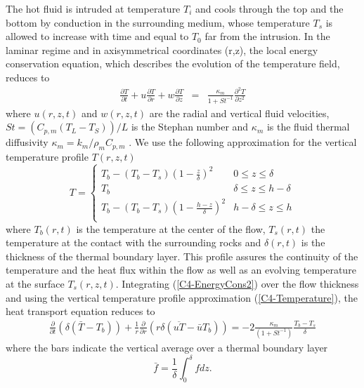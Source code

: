 The hot fluid  is intruded at temperature $T_i$ and  cools through the
top  and the  bottom by  conduction in  the surrounding  medium, whose
temperature $T_s$ is allowed to increase  with time and equal to $T_0$
far from  the intrusion. In  the laminar regime and  in axisymmetrical
coordinates  (r,z),  the  local energy  conservation  equation,  which
describes the evolution of the temperature field, reduces to
\begin{eqnarray}
  \frac{\partial T}{\partial t}+ u\frac{\partial T}{\partial r}
  + w\frac{\partial T}{\partial z}  &=& \frac{ \kappa_m}{1+St^{-1}}  \frac{\partial^2
                                        T}{\partial               z^2}
                                        \label{C4-EnergyCons2}
\end{eqnarray}
where  $u(r,z,t)$ and  $w(r,z,t)$ are  the radial  and vertical  fluid
velocities,  $St  =\left(C_{p,m}(T_L-T_S)\right)/L$   is  the  Stephan
number   and    $\kappa_m$   is   the   fluid    thermal   diffusivity
$\kappa_m  = k_m/\rho_m  C_{p,m}$ \citep{Thorey:2015vs}.   We use  the
following   approximation  for   the   vertical  temperature   profile
$T(r,z,t)$
\begin{equation}
  T=
  \begin{cases}
    T_b - (T_b-T_s)(1-\frac{z}{\delta})^2 & 0 \le z\le \delta \\
    T_b & \delta \le z\le h-\delta \\
    T_b - (T_b-T_s)(1-\frac{h-z}{\delta})^2 & h-\delta \le z\le h\\
  \end{cases}
  \label{C4-Temperature}
\end{equation}
where  $T_b(r,t)$  is the  temperature  at  the  center of  the  flow,
$T_s(r,t)$ the temperature  at the contact with  the surrounding rocks
and $\delta(r,t)$ is the thickness of the thermal boundary layer. This
profile assures  the continuity of  the temperature and the  heat flux
within the  flow as  well as  an evolving  temperature at  the surface
$T_s(r,z,t)$.   Integrating   (\ref{C4-EnergyCons2})  over   the  flow
thickness  and using  the vertical  temperature profile  approximation
(\ref{C4-Temperature}), the heat transport equation reduces to
\begin{eqnarray}
  \frac{\partial}{\partial
  t}\left( \delta( \bar{T}-T_b)\right)+\frac{1}{r}\frac{\partial}{\partial
  r} \left( r\delta(\overline{uT}-\bar{u}T_b)\right) = -2\frac{\kappa_m}{(1+St^{-1})}\frac{T_b-T_s}{\delta}
  \label{C4-LocalHeat3}
\end{eqnarray}
where the bars  indicate the vertical average over  a thermal boundary
layer
\begin{equation}
  \bar{f} = \frac{1}{\delta}\int_0^\delta f dz.
\end{equation}

